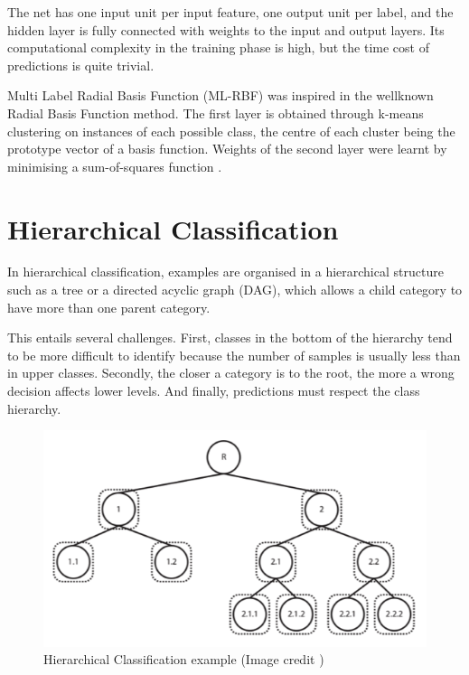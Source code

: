 The net has one input unit per input feature, one output unit
per label, and the hidden layer is fully connected with weights to the input and
output layers. Its computational complexity in the training phase is high, but the
time cost of predictions is quite trivial.


Multi Label Radial Basis Function (ML-RBF) \cite{Zhang2009} was inspired in the wellknown Radial Basis Function method. 
The first layer is obtained through k-means clustering on
instances of each possible class, the centre of each cluster being the prototype
vector of a basis function. Weights of the second layer were learnt by minimising
a sum-of-squares function \cite{Gibaja2014}.
\newpage

\section{Hierarchical Classification}

In hierarchical classification, examples are organised in a hierarchical
structure such as a tree or a directed acyclic graph (DAG), which allows a child
category to have more than one parent category. 

This entails several challenges.
First, classes in the bottom of the hierarchy tend to be more difficult to identify
because the number of samples is usually less than in upper classes. 
Secondly, the closer a category is to the root, the more a wrong decision affects lower levels. And
finally, predictions must respect the class hierarchy. 

\begin{figure}[th]
    \centering
    \includegraphics[width=1.0\textwidth]{Figures/hierachical.png}
    \decoRule
    \caption[Hierarchical Classification example]{Hierarchical Classification example (Image credit \cite{Silla2011})}
    \label{fig:hierachical}
\end{figure}


